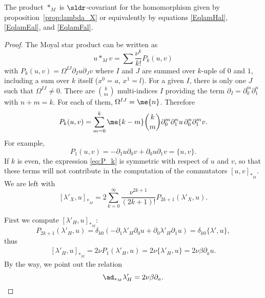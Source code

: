 \begin{proposition}
	The product $\ast_M$ is $\sldr$-covariant for the homomorphism given by proposition~\ref{prop:lambda_X} or equivalently by equations \eqref{EqlamHal}, \eqref{EqlamEal}, and \eqref{EqlamFal}.
\end{proposition}

\begin{proof}
The Moyal star product can be written as
\[
	u\ast_M v=\sum \frac{\nu^k}{k!}P_k(u,v)
\]
with $P_k(u,v)=\Omega^{IJ}\partial_Iu\partial_Jv$ where $I$ and $J$ are summed over $k$-uple of $0$ and $1$, including a sum over $k$ itself ($x^0=a$, $x^1=l$). For a given $I$, there is only one $J$ such that $\Omega^{IJ}\neq 0$. There are $\binom{k}{m}$ multi-indices $I$ providing the term $\partial_I=\partial_0^m\partial_1^n$ with $n+m=k$. For each of them, $\Omega^{IJ}=\me{n}$. Therefore
\begin{equation}\label{eq:P_k}
	P_k(u,v)=\sum_{m=0}^k\me{k-m}\binom{k}{m}\partial_0^m\partial_1^nu\,\partial_0^n\partial_1^mv.
\end{equation}
For example,
\[
	P_1(u,v)=-\partial_1u\partial_0v+\partial_0u\partial_1v=\{u,v\}.
\]
If $k$ is even, the expression \eqref{eq:P_k} is symmetric with respect of $u$ and $v$, so that these terms will not contribute in the computation of the commutators $[u,v]_{\ast_M}$. We are left with
\begin{equation}\label{eq:comm_lambda_X}
	[\lambda'_X,u]_{\ast_M}
	=2\sum_{k=0}^{\infty}\frac{\nu^{2k+1}}{(2k+1)!}P_{2k+1}(\lambda'_X,u).
\end{equation}

First we compute $[\lambda'_H,u]_{\ast_M}$:
\begin{equation}
	P_{2k+1}(\lambda'_H,u)=\delta_{k0}(-\partial_1\lambda'_H\partial_0 u+\partial_0\lambda'_H\partial_1 u)=\delta_{k0}\{\lambda',u\},
\end{equation}
thus
\begin{equation}
	\begin{split}
		[\lambda'_H,u]_{\ast_M}=2\nu P_1(\lambda'_H,u)
		=2\nu\{\lambda'_H,u\}
		=2\nu\beta\partial_au.
	\end{split}
\end{equation}
By the way, we point out the relation
\[
	\ad_{\ast_M}\lambda'_H=2\nu\beta\partial_a.
\]


\end{proof}
